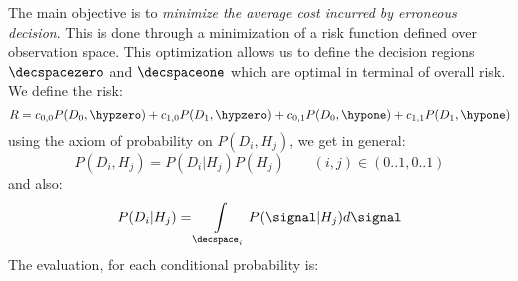 The main objective is to \emph{minimize the average cost incurred by erroneous decision}\citep{duda2012pattern}. This is done through a minimization of a risk function defined over observation space. This optimization allows us to define the decision regions $\decspacezero$ and $\decspaceone$ which are optimal in terminal of overall risk. We define the risk:
\begin{equation}
R = c_{0,0} P(D_0, \hypzero) + c_{1,0} P(D_1, \hypzero) + c_{0,1} P(D_0, \hypone) + c_{1,1} P(D_1, \hypone)
\end{equation}
using the axiom of probability on $P(D_i,H_j)$, we get in general:
\begin{equation}
P(D_i,H_j) = P(D_i|H_j) P(H_j) \qquad (i,j) \in (0..1,0..1)
\end{equation}
and also:
\begin{equation}
P(D_i|H_j) = \int\limits_{\decspace_i}P(\signal|H_j)d\signal
\end{equation}
The evaluation, for each conditional probability is:
